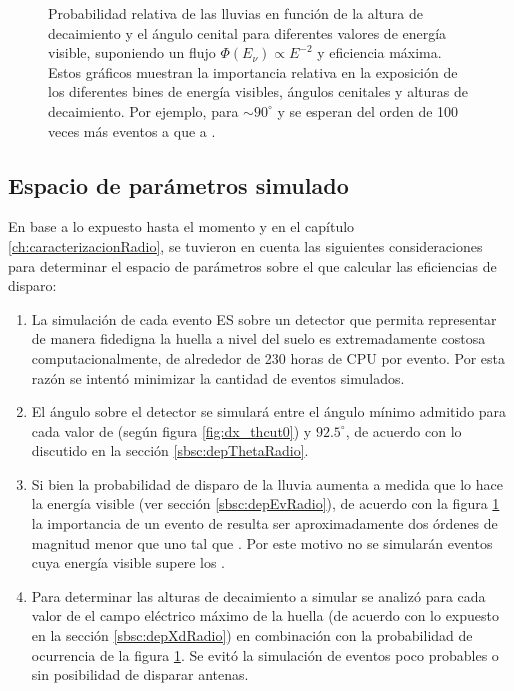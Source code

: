 \begin{figure}[ht!]
		\caption{\label{fig:radioShWeights}
		Probabilidad relativa  de las lluvias en funci\'on de la altura de decaimiento y el \'angulo cenital para diferentes valores de energ\'ia visible, suponiendo un flujo $\Phi(E_\nu)\propto E^{-2}$ y eficiencia m\'axima.
		Estos gr\'aficos muestran la importancia relativa en la exposici\'on de los diferentes bines de energ\'ia visibles, \'angulos cenitales y alturas de decaimiento.
		Por ejemplo, para $\sim90^\circ$ y  se esperan del orden de 100 veces m\'as eventos a  que a .
		}
	\end{figure}
	
	\subsection{Espacio de par\'ametros simulado}
	
	En base a lo expuesto hasta el momento y en el cap\'itulo \ref{ch:caracterizacionRadio}, se tuvieron en cuenta las siguientes consideraciones para determinar el espacio de par\'ametros sobre el que calcular las eficiencias de disparo:
	\begin{enumerate}
		\item La simulaci\'on de cada evento ES sobre un detector que permita representar de manera fidedigna la huella a nivel del suelo es extremadamente costosa computacionalmente, de alrededor de 230 horas de CPU por evento.
		Por esta raz\'on se intent\'o minimizar la cantidad de eventos simulados.
		\item El \'angulo sobre el detector se simular\'a entre el \'angulo m\'inimo admitido para cada valor de \xd{} (seg\'un figura \ref{fig:dx_thcut0}) y $92.5^\circ$, de acuerdo con lo discutido en la secci\'on \ref{sbsc:depThetaRadio}.
		\item Si bien la probabilidad de disparo de la lluvia aumenta a medida que lo hace la energ\'ia visible (ver secci\'on \ref{sbsc:depEvRadio}), de acuerdo con la figura \ref{fig:radioShWeights} la importancia de un evento de  resulta ser aproximadamente dos \'ordenes de magnitud menor que uno tal que . Por este motivo no se simular\'an eventos cuya energ\'ia visible supere los . 
		\item Para determinar las alturas de decaimiento a simular se analiz\'o para cada valor de \ev{} el campo el\'ectrico m\'aximo de la huella (de acuerdo con lo expuesto en la secci\'on \ref{sbsc:depXdRadio}) en combinaci\'on con la probabilidad de ocurrencia de la figura \ref{fig:radioShWeights}. Se evit\'o la simulaci\'on de eventos poco probables o sin posibilidad de disparar antenas.
	\end{enumerate}
	
